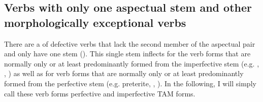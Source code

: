 \subsection{Verbs with only one aspectual stem and other morphologically exceptional verbs}
\label{ssec:Verbs with only one aspectual stem} 
There are a  of defective verbs that lack the second member of the aspectual pair and only have one stem (). This single stem inflects for the verb forms that are normally only or at least predominantly formed from the imperfective stem (e.g. , , ) as well as for verb forms that are normally only or at least predominantly formed from the perfective stem (e.g. preterite, , ). In the following, I will simply call these verb forms perfective and imperfective TAM forms.

